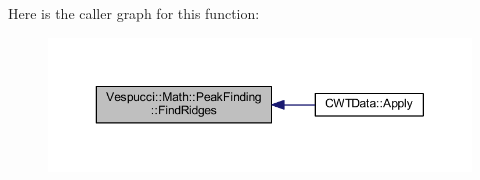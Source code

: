 Here is the caller graph for this function\+:
\nopagebreak
\begin{figure}[H]
\begin{center}
\leavevmode
\includegraphics[width=350pt]{namespace_vespucci_1_1_math_1_1_peak_finding_aede120546d4e46e4073058508fdd7ae9_icgraph}
\end{center}
\end{figure}


